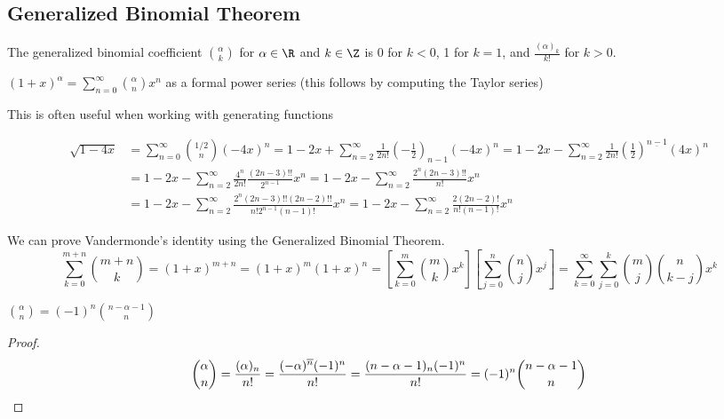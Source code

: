 \documentclass[a4paper]{article}
\begin{document}
\subsection{Generalized Binomial Theorem}

\begin{definition}
The generalized binomial coefficient $\binom\alpha k$ for $\alpha\in\R$ and $k\in\Z$ is 0 for $k<0$, 1 for $k=1$, and $\frac{(\alpha)_k}{k!}$ for $k>0$.
\end{definition}

\begin{theorem}
$(1+x)^\alpha=\sum_{n=0}^\infty\binom\alpha nx^n$ as a formal power series (this follows by computing the Taylor series)
\begin{arrows}
\item This is often useful when working with generating functions
\end{arrows}
\end{theorem}

\begin{example}\label{ex_sqrt_gen_bin}
\begin{align*}
\sqrt{1-4x}
&= \sum_{n=0}^\infty\binom{1/2}n(-4x)^n
= 1-2x+\sum_{n=2}^\infty\frac1{2n!}\left(-\frac12\right)_{n-1}(-4x)^n
= 1-2x-\sum_{n=2}^\infty\frac1{2n!}\left(\frac12\right)^{\underline{n-1}}(4x)^n\\
&= 1-2x-\sum_{n=2}^\infty\frac{4^n}{2n!}\frac{(2n-3)!!}{2^{n-1}}x^n
= 1-2x-\sum_{n=2}^\infty\frac{2^n(2n-3)!!}{n!}x^n\\
&= 1-2x-\sum_{n=2}^\infty\frac{2^n(2n-3)!!(2n-2)!!}{n!2^{n-1}(n-1)!}x^n
= 1-2x-\sum_{n=2}^\infty\frac{2(2n-2)!}{n!(n-1)!}x^n
\end{align*}
\end{example}

\begin{example}
We can prove Vandermonde's identity using the Generalized Binomial Theorem.
\begin{equation*}
\sum_{k=0}^{m+n}\binom{m+n}k=(1+x)^{m+n}=(1+x)^m(1+x)^n=\left[\sum_{k=0}^m\binom mkx^k\right]\left[\sum_{j=0}^n\binom njx^j\right]=\sum_{k=0}^\infty\sum_{j=0}^k\binom mj\binom n{k-j}x^k
\end{equation*}
\end{example}

\begin{theorem}\label{alt_binom}
$\displaystyle\binom \alpha n=(-1)^n\binom{n-\alpha-1}n$

\begin{hl}
\begin{proof}
\begin{equation*}
\binom\alpha n
=\frac{(\alpha)_n}{n!}
=\frac{(-\alpha)^{\overline n}(-1)^n}{n!}
=\frac{(n-\alpha-1)_n(-1)^n}{n!}
=(-1)^n\binom{n-\alpha-1}n\qedhere
\end{equation*}
\end{proof}
\end{hl}
\end{theorem}
\end{document}
